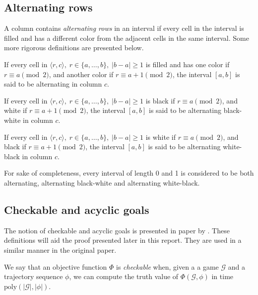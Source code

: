 \subsection{Alternating rows}
A column contains \textit{alternating rows} in an interval if every cell in the interval is filled and has a different color from the adjacent cells in the same interval. Some more rigorous definitions are presented below. \\

\begin{defn}
If every cell in $\langle r, c \rangle, \; r \in \{a, \ldots, b\}, \; |b-a| \geq 1$ is filled and has one color if $r \equiv a \pmod{2}$, and another color if $r \equiv a + 1 \pmod{2}$, the interval $\left[ a, b \right]$ is said to be alternating in column $c$.
\end{defn}

\bigbreak

\begin{defn}
If every cell in $\langle r, c \rangle, \; r \in \{a, \ldots, b\}, \; |b-a| \geq 1$ is black if $r \equiv a \pmod{2}$, and white if $r \equiv a + 1 \pmod{2}$, the interval $\left[ a, b \right]$ is said to be alternating black-white in column $c$.
\end{defn}

\bigbreak

\begin{defn}
If every cell in $\langle r, c \rangle, \; r \in \{a, \ldots, b\}, \; |b-a| \geq 1$ is white if $r \equiv a \pmod{2}$, and black if $r \equiv a + 1 \pmod{2}$, the interval $\left[ a, b \right]$ is said to be alternating white-black in column $c$.
\end{defn}

For sake of completeness, every interval of length 0 and 1 is considered to be both alternating, alternating black-white and alternating white-black.

\subsection{Checkable and acyclic goals}
The notion of checkable and acyclic goals is presented in paper by \citeauthor{tetris}. These definitions will aid the proof presented later in this report. They are used in a similar manner in the original paper.\\

\begin{defn}
\label{defn:checkable}
We say that an objective function $\Phi$ is \textit{checkable} when, given a a game $\mathcal{G}$ and a trajectory sequence $\phi$, we can compute the truth value of $\Phi(\mathcal{G}, \phi)$ in time $\text{poly}(|\mathcal{G}|, |\phi|)$.
\end{defn}

